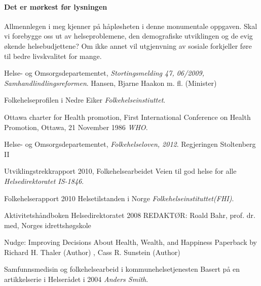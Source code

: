 \documentclass[12pt]{memoir} %
\begin{document}
		\paragraph{Det er mørkest før lysningen\\}
			Allmennlegen i meg kjenner på håpløsheten i denne monumentale oppgaven. Skal vi forebygge oss ut av helseproblemene, den demografiske utviklingen og de evig økende helsebudjettene? Om ikke annet vil utgjenvning av sosiale forkjeller føre til bedre livskvalitet for mange.  

\listoffigures

 \renewcommand{\bibname}{Kilder:}
              \begin{thebibliography}{99}

                  Helse- og Omsorgsdepartementet,
                  \emph{Stortingsmelding 47, 06/2009, Samhandlindlingsreformen}.
                  Hansen, Bjarne Haakon m. fl. (Minister)

                  Folkehelseprofilen i Nedre Eiker
                  \emph{Folkehelseinstiuttet}.
                  
                  Ottawa charter for Health promotion,
                  First International Conference on Health Promotion, Ottawa, 21 November 1986
                  \emph{WHO}.

                  Helse- og Omsorgsdepartementet,
                  \emph{Folkehelseloven, 2012}.
                  Regjeringen Stoltenberg II


                  Utviklingstrekkrapport 2010, Folkehelsearbeidet
                  Veien til god helse for alle
                  \emph{Helsedirektoratet IS-1846}.

                  Folkehelserapport 2010
                  Helsetilstanden i Norge
                  \emph{Folkehelseinstituttet(FHI)}.

                  Aktivitetshåndboken
                  Helsedirektoratet 2008
                  REDAKTØR: Roald Bahr, prof. dr. med, Norges idrettshøgskole
                 
                 	Nudge: Improving Decisions About Health, Wealth, and Happiness Paperback
					by Richard H. Thaler (Author) , Cass R. Sunstein  (Author)
                 
                  Samfunnsmedisin og folkehelsearbeid i kommunehelsetjenesten
                  Basert på en artikkelserie i Helserådet i 2004
                  \emph{Anders Smith}.

\end{thebibliography}
\end{document}
